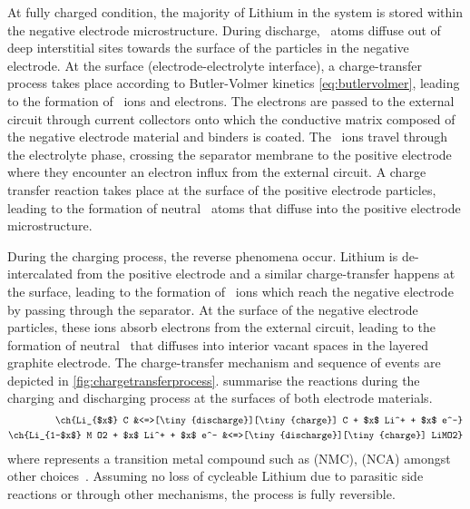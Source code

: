 At fully  charged condition,  the majority  of Lithium in  the system  is stored
within  the  negative  electrode  microstructure.  During  discharge,  ~atoms  diffuse  out of  deep  interstitial  sites  towards  the surface  of  the
particles  in  the negative  electrode.  At  the surface  (electrode-electrolyte
interface),  a charge-transfer  process takes  place according  to Butler-Volmer
kinetics \cref{eq:butlervolmer}, leading to the  formation of ~ions and
electrons.  The electrons  are passed  to the  external circuit  through 
current collectors  onto which  the conductive matrix  composed of  the negative
electrode material and binders is coated.  The ~ions travel through the
electrolyte phase,  crossing the  separator membrane  to the  positive electrode
where they  encounter an  electron influx  from the  external circuit.  A charge
transfer  reaction  takes  place  at  the  surface  of  the  positive  electrode
particles, leading to the formation of neutral ~atoms that diffuse into
the positive electrode microstructure.

During  the   charging  process,  the   reverse  phenomena  occur.   Lithium  is
de-intercalated  from  the  positive  electrode and  a  similar  charge-transfer
happens   at   the   surface,   leading    to   the   formation   of   ~ions   which   reach   the   negative   electrode   by   passing   through   the
separator.  At   the  surface  of   the  negative  electrode   particles,  these
ions   absorb   electrons   from   the  external   circuit,   leading   to   the
formation   of   neutral~   that  diffuses   into   interior   vacant
spaces  in  the  layered   graphite  electrode.  The  charge-transfer  mechanism
and  sequence   of  events  are   depicted  in \cref{fig:chargetransferprocess}.
 summarise the  reactions during the
charging and discharging process at the surfaces of both electrode materials.
\begin{align}
    \ch{Li_{$x$} C                            &<=>[\tiny{discharge}][\tiny{charge}] C + $x$ Li^+ + $x$ e^-}\label{eq:NegElectrodeRxn}\\
    \ch{Li_{1-$x$} M O2 + $x$ Li^+  + $x$ e^- &<=>[\tiny{discharge}][\tiny{charge}] LiMO2}\label{eq:PosElectrodeRxn}
\end{align}
where       represents    a    transition   metal    compound   such    as
   (NMC),      (NCA)
amongst other  choices~\cite{Reddy2011}. Assuming  no loss of  cycleable Lithium
due to  parasitic side  reactions or  through other  mechanisms, the  process is
fully reversible.


